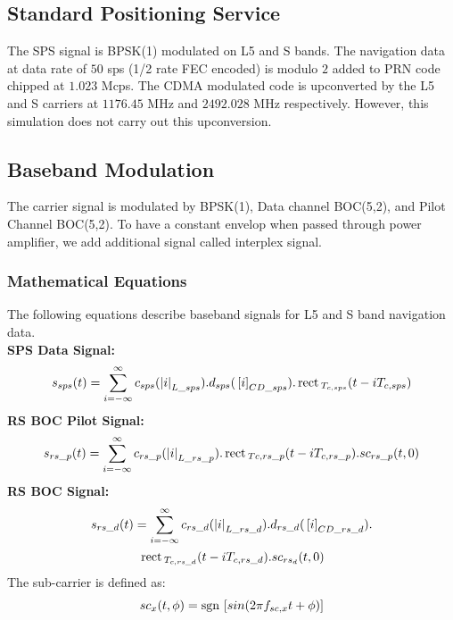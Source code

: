 \subsection{Standard Positioning Service}
The SPS signal is BPSK(1) modulated on L5 and S bands. The navigation data at data rate of $50$ sps (1/2 rate FEC encoded) is modulo $2$ added to PRN code chipped at $1.023$ Mcps. The CDMA modulated code is upconverted by the L5 and S carriers at $1176.45$ MHz and $2492.028$ MHz respectively. However, this simulation does not carry out this upconversion.

\subsection{Baseband Modulation}
The carrier signal is modulated by BPSK(1), Data channel BOC(5,2), and Pilot Channel BOC(5,2). To have a constant envelop when passed through power amplifier, we add additional signal called interplex signal.

\subsubsection{Mathematical Equations}
The following equations describe baseband signals for L5 and S band navigation data.
\\
\textbf{SPS Data Signal:}
\begin{equation}
	s_{sps}(t) = \sum_{i=-\infty}^{\infty} c_{sps}(\left\vert i\right\vert_{L\_sps}) . d_{sps}({}\left[i\right]_{CD\_sps}) . \,\text{rect}\,_{T_{c,sps}}(t-iT_{c,sps})
\end{equation}
\textbf{RS BOC Pilot Signal:}
\begin{equation}
	s_{rs\_p}(t) = \sum_{i=-\infty}^{\infty} c_{rs\_p}(\left\vert i\right\vert_{L\_rs\_p}) . \,\text{rect}\,_{Tc,rs\_p}(t-iT_{c,rs\_p}). sc_{rs\_p}(t,0)
\end{equation}
\textbf{RS BOC Signal:}
\begin{multline}
	s_{rs\_d}(t) = \sum_{i=-\infty}^{\infty} c_{rs\_d}(\left\vert i\right\vert_{L\_rs\_d}) . d_{rs\_d}({}\left[i\right]_{CD\_rs\_d}).  \\ 
	                       \,\text{rect}\,_{T_{c,rs\_d}}(t-iT_{c,rs\_d}). sc_{rs_d}(t,0)
\end{multline}
The sub-carrier is defined as:
\begin{equation}
	sc_x(t,\phi) = \mathop{\mathrm{sgn}}{}\left[sin(2 \pi f_{sc,x}t + \phi)\right]
\end{equation}

